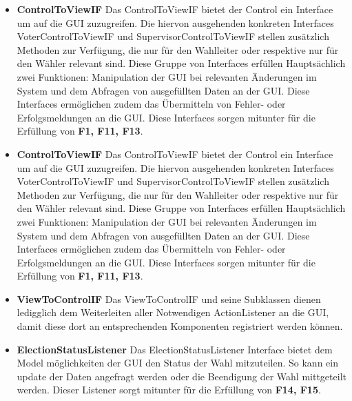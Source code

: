 \documentclass[parskip=full]{scrartcl}
\newcommand{\fakeparagraph}[1]{\textbf{#1}}
\begin{document}
	\begin{itemize}
	\item\fakeparagraph{ControlToViewIF} Das ControlToViewIF bietet der Control ein Interface um auf die GUI zuzugreifen.
	Die hiervon ausgehenden konkreten Interfaces VoterControlToViewIF und SupervisorControlToViewIF stellen zusätzlich Methoden zur Verfügung, die nur für den Wahlleiter oder respektive nur für den Wähler relevant sind. 
	Diese Gruppe von Interfaces erfüllen Hauptsächlich zwei Funktionen: Manipulation der GUI bei relevanten Änderungen im System und dem Abfragen von ausgefüllten Daten an der GUI.
	Diese Interfaces ermöglichen zudem das Übermitteln von Fehler- oder Erfolgsmeldungen an die GUI.
	Diese Interfaces sorgen mitunter für die Erfüllung von \textbf{F1, F11, F13}.
	\end{itemize} 
	\begin{itemize}
	\item\fakeparagraph{ControlToViewIF} Das ControlToViewIF bietet der Control ein Interface um auf die GUI zuzugreifen.
	Die hiervon ausgehenden konkreten Interfaces VoterControlToViewIF und SupervisorControlToViewIF stellen zusätzlich Methoden zur Verfügung, die nur für den Wahlleiter oder respektive nur für den Wähler relevant sind. 
	Diese Gruppe von Interfaces erfüllen Hauptsächlich zwei Funktionen: Manipulation der GUI bei relevanten Änderungen im System und dem Abfragen von ausgefüllten Daten an der GUI.
	Diese Interfaces ermöglichen zudem das Übermitteln von Fehler- oder Erfolgsmeldungen an die GUI.
	Diese Interfaces sorgen mitunter für die Erfüllung von \textbf{F1, F11, F13}.
	\end{itemize} 
	\begin{itemize}
	\item\fakeparagraph{ViewToControlIF} Das ViewToControlIF und seine Subklassen dienen ledigglich dem Weiterleiten aller Notwendigen ActionListener an die GUI, damit diese dort an entsprechenden Komponenten registriert werden können.
	\end{itemize} 
	\begin{itemize}
	\item\fakeparagraph{ElectionStatusListener} Das ElectionStatusListener Interface bietet dem Model möglichkeiten der GUI den Status der Wahl mitzuteilen. So kann ein update der Daten angefragt werden oder die Beendigung der Wahl mittgeteilt werden.
	Dieser Listener sorgt mitunter für die Erfüllung von \textbf{F14, F15}.
	\end{itemize} 
  
\end{document}
